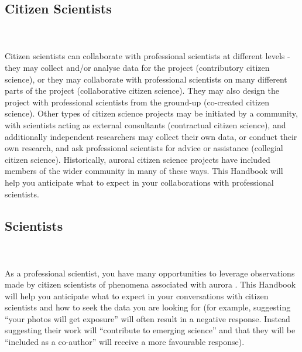 \documentclass{article}
\begin{document}
\subsection{Citizen Scientists}
\vspace{0.5cm} \noindent{}\\
\\
Citizen scientists can collaborate with professional scientists at different levels - they may collect and/or analyse data for the project (contributory citizen science), or they may collaborate with professional scientists on many different parts of the project (collaborative citizen science). They may also design the project with professional scientists from the ground-up (co-created citizen science). Other types of citizen science projects may be initiated by a community, with scientists acting as external consultants (contractual citizen science), and additionally independent researchers may collect their own data, or conduct their own research, and ask professional scientists for advice or assistance (collegial citizen science). Historically, auroral citizen science projects have included members of the wider community in many of these ways. This Handbook will help you anticipate what to expect in your collaborations with professional scientists.

\subsection{Scientists}
\vspace{0.5cm}
\noindent{}\\
\\

As a professional scientist, you have many opportunities to leverage observations made by citizen scientists of phenomena associated with aurora . This Handbook will help you anticipate what to expect in your conversations with citizen scientists and how to seek the data you are looking for (for example, suggesting ``your photos will get exposure'' will often result in a negative response. Instead suggesting their work will ``contribute to emerging science'' and that they will be ``included as a co-author'' will receive a more favourable response).
\end{document}
